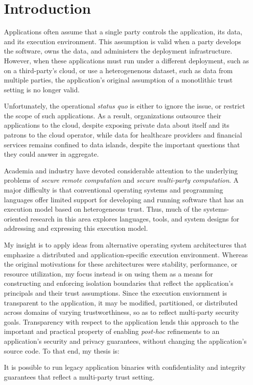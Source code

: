 \section{Introduction}
\label{sec:intro}

Applications often assume that a single party controls the application, its
data, and its execution environment.
%
This assumption is valid when a party develops the software, owns the data, 
and administers the deployment infrastructure.
%
However, when these applications must run under a different deployment, such as
on a third-party's cloud, or use a heterogenenous dataset, such as data from
multiple parties, the application's original assumption of a monotlithic trust
setting is no longer valid.


Unfortunately, the operational \emph{status quo} is either to ignore the issue,
or restrict the scope of such applications.  
%
As a result, organizations outsource their applications to the cloud, despite
exposing private data about itself and its patrons to the cloud operator, while
data for healthcare providers and financial services remains confined to data
islands, despite the important questions that they could answer in aggregate.



Academia and industry have devoted considerable attention to the underlying
problems of \emph{secure remote computation} and \emph{secure multi-party
computation}.
%
A major difficulty is that conventional operating systems and
programming languages offer limited support for developing and running software
that has an execution model based on heterogeneous trust.
%
Thus, much of the systems-oriented research in this area explores languages,
tools, and system designs for addressing and expressing this execution model.


My insight is to apply ideas from alternative operating system
architectures that emphasize a distributed and application-specific execution
environment.
%
Whereas the original motivations for these architectures were stability,
performance, or resource utilization, my focus instead is on using them as a
means for constructing and enforcing isolation boundaries that reflect the
application's principals and their trust assumptions.
%
Since the execution enviornment is transparent to the application, 
it may be modified, partitioned, or distributed across domains of varying
trustworthiness, so as to reflect multi-party security goals.
%
Transparency with respect to the application lends this approach to the
important and practical property of enabling \emph{post-hoc} refinements to an
application's security and privacy guarantees, without changing the
application's source code.
To that end, my thesis is:
\begin{displayquote}
    It is possible to run legacy application binaries with confidentiality and 
    integrity guarantees that reflect a multi-party trust setting.
\end{displayquote}


